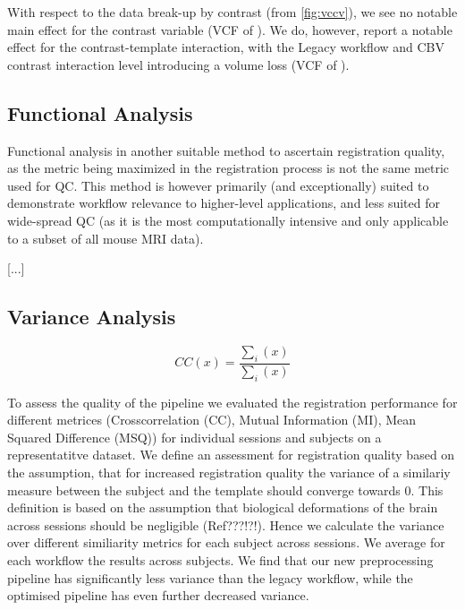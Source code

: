 With respect to the data break-up by contrast (from \cref{fig:vccv}), we see no notable main effect for the contrast variable
(VCF of ).
We do, however, report a notable effect for the contrast-template interaction, with the Legacy workflow and CBV contrast interaction level introducing a volume loss
(VCF of ).

\subsection{Functional Analysis}

Functional analysis in another suitable method to ascertain registration quality, as the metric being maximized in the registration process is not the same metric used for QC.
This method is however primarily (and exceptionally) suited to demonstrate workflow relevance to higher-level applications, and less suited for wide-spread QC (as it is the most computationally intensive and only applicable to a subset of all mouse MRI data).

\begin{center}
        \textcolor{lg}{[...]}
\end{center}


\subsection{Variance Analysis}

\color{lg}
\[ CC(x) = \frac{\sum_i{(x)}}{\sum_i{(x)}} \]


To assess the quality of the pipeline we evaluated the registration performance for different metrices (Crosscorrelation (CC), Mutual Information (MI), Mean Squared Difference (MSQ)) for individual sessions and subjects on a representatitve dataset.
We define an assessment for registration quality based on the assumption, that for increased registration quality the variance of a similariy measure between the subject and the template should converge towards 0.
This definition is based on the assumption that biological deformations of the brain across sessions should be negligible (Ref???!?!).
Hence we calculate the variance over different similiarity metrics for each subject across sessions.
We average for each workflow the results across subjects.
We find that our new preprocessing pipeline has significantly less variance than the legacy workflow, while the optimised pipeline has even further decreased variance.
